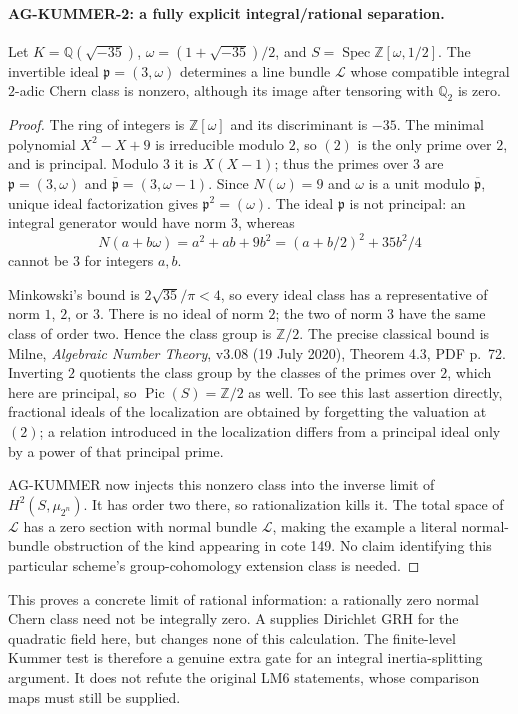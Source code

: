 \paragraph{AG-KUMMER-2: a fully explicit integral/rational separation.}
Let $K=\mathbb Q(\sqrt{-35})$, $\omega=(1+\sqrt{-35})/2$, and
$S=\operatorname{Spec}\mathbb Z[\omega,1/2]$. The invertible ideal
$\mathfrak p=(3,\omega)$ determines a line bundle $\mathcal L$ whose
compatible integral $2$-adic Chern class is nonzero, although its image
after tensoring with $\mathbb Q_2$ is zero.

\begin{proof}
The ring of integers is $\mathbb Z[\omega]$ and its discriminant is
$-35$. The minimal polynomial $X^2-X+9$ is irreducible modulo $2$,
so $(2)$ is the only prime over $2$, and is principal. Modulo $3$ it is
$X(X-1)$; thus the primes over $3$ are
$\mathfrak p=(3,\omega)$ and $\overline{\mathfrak p}=(3,\omega-1)$.
Since $N(\omega)=9$ and $\omega$ is a unit modulo
$\overline{\mathfrak p}$, unique ideal factorization gives
$\mathfrak p^2=(\omega)$. The ideal $\mathfrak p$ is not principal:
an integral generator would have norm $3$, whereas
\[
 N(a+b\omega)=a^2+ab+9b^2=(a+b/2)^2+35b^2/4
\]
cannot be $3$ for integers $a,b$.

Minkowski's bound is $2\sqrt{35}/\pi<4$, so every ideal class has a
representative of norm $1$, $2$, or $3$. There is no ideal of norm $2$;
the two of norm $3$ have the same class of order two. Hence the class
group is $\mathbb Z/2$. The precise classical bound is Milne,
\emph{Algebraic Number Theory}, v3.08 (19 July 2020), Theorem 4.3,
PDF p.~72. Inverting $2$ quotients the class group by the classes of
the primes over $2$, which here are principal, so
$\operatorname{Pic}(S)=\mathbb Z/2$ as well. To see this last assertion
directly, fractional ideals of the localization are obtained by forgetting
the valuation at $(2)$; a relation introduced in the localization differs
from a principal ideal only by a power of that principal prime.

AG-KUMMER now injects this nonzero class into the inverse limit of
$H^2(S,\mu_{2^n})$. It has order two there, so rationalization kills it.
The total space of $\mathcal L$ has a zero section with normal bundle
$\mathcal L$, making the example a literal normal-bundle obstruction of
the kind appearing in cote 149. No claim identifying this particular
scheme's group-cohomology extension class is needed.
\end{proof}

This proves a concrete limit of rational information: a rationally zero
normal Chern class need not be integrally zero. A supplies Dirichlet GRH
for the quadratic field here, but changes none of this calculation.
The finite-level Kummer test is therefore a genuine extra gate for an
integral inertia-splitting argument. It does not refute the original
LM6 statements, whose comparison maps must still be supplied.

